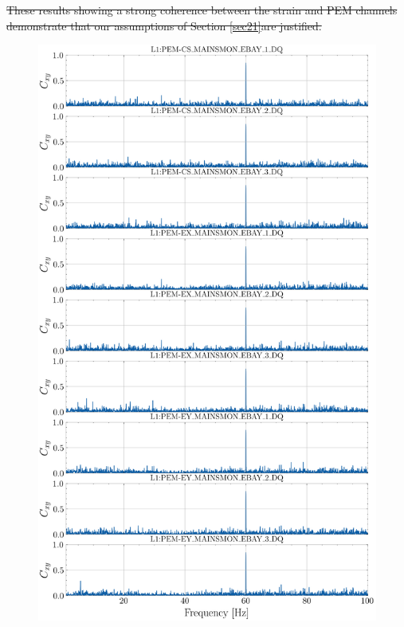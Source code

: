 \documentclass[pra,superscriptaddress,reprint,amsmath,amssymb,nofootinbib]{revtex4-2}
\providecommand{\DIFdeltex}[1]{{\protect\color{red}\sout{#1}}}                      %
\providecommand{\DIFdelbegin}{} %
\providecommand{\DIFdelend}{} %
\providecommand{\DIFdelbeginFL}{} %
\providecommand{\DIFdel}[1]{\texorpdfstring{\DIFdeltex{#1}}{}} %
\newcommand{\DIFscaledelfig}{0.5}
\newlength{\DIFdelgraphicswidth} %
\newlength{\DIFdelgraphicsheight} %
\newcommand{\DIFdelincludegraphics}[2][]{%
\sbox{\DIFdelgraphicsbox}{\DIFOincludegraphics[#1]{#2}}%
\settoboxwidth{\DIFdelgraphicswidth}{\DIFdelgraphicsbox} %
\settoboxtotalheight{\DIFdelgraphicsheight}{\DIFdelgraphicsbox} %
\scalebox{\DIFscaledelfig}{%
\parbox[b]{\DIFdelgraphicswidth}{\usebox{\DIFdelgraphicsbox}\\[-\baselineskip] \rule{\DIFdelgraphicswidth}{0em}}\llap{\resizebox{\DIFdelgraphicswidth}{\DIFdelgraphicsheight}{%
\setlength{\unitlength}{\DIFdelgraphicswidth}%
\begin{picture}(1,1)%
\thicklines\linethickness{2pt} %
{\color[rgb]{1,0,0}\put(0,0){\framebox(1,1){}}}%
{\color[rgb]{1,0,0}\put(0,0){\line( 1,1){1}}}%
{\color[rgb]{1,0,0}\put(0,1){\line(1,-1){1}}}%
\end{picture}%
}\hspace*{3pt}}} %
} %
\DeclareRobustCommand{\DIFdelbegin}{\DIFOdelbegin \let\includegraphics\DIFdelincludegraphics} %
\DeclareRobustCommand{\DIFdelend}{\DIFOaddend \let\includegraphics\DIFOincludegraphics} %
\DeclareRobustCommand{\DIFdelbeginFL}{\DIFOdelbeginFL \let\includegraphics\DIFdelincludegraphics} %
\begin{document}
\DIFdelbegin \DIFdel{These results showing a strong coherence between the strain and PEM channels demonstrate that our assumptions of Section \ref{sec21}are justified.
}\DIFdelend \begin{figure}
	\begin{center}
		\includegraphics[width=\columnwidth]{images/stacked_coherence_plot}
	\end{center}
	\DIFdelbeginFL %

\end{figure}
\end{document}
